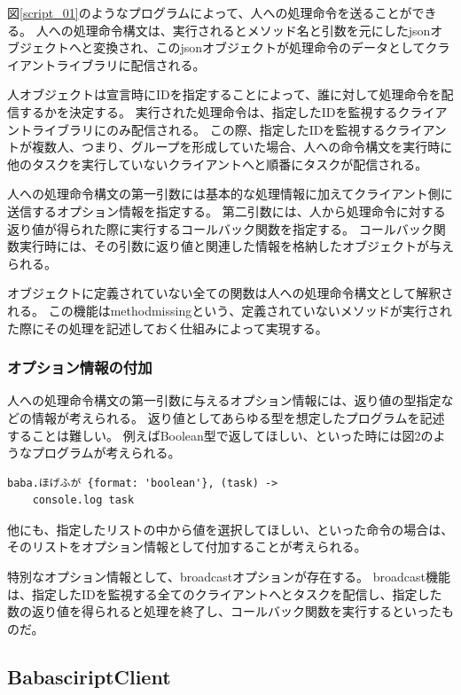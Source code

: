 図\ref{script_01}のようなプログラムによって、人への処理命令を送ることができる。
人への処理命令構文は、実行されるとメソッド名と引数を元にしたjsonオブジェクトへと変換され、このjsonオブジェクトが処理命令のデータとしてクライアントライブラリに配信される。

人オブジェクトは宣言時にIDを指定することによって、誰に対して処理命令を配信するかを決定する。
実行された処理命令は、指定したIDを監視するクライアントライブラリにのみ配信される。
この際、指定したIDを監視するクライアントが複数人、つまり、グループを形成していた場合、人への命令構文を実行時に他のタスクを実行していないクライアントへと順番にタスクが配信される。

人への処理命令構文の第一引数には基本的な処理情報に加えてクライアント側に送信するオプション情報を指定する。
第二引数には、人から処理命令に対する返り値が得られた際に実行するコールバック関数を指定する。
コールバック関数実行時には、その引数に返り値と関連した情報を格納したオブジェクトが与えられる。

オブジェクトに定義されていない全ての関数は人への処理命令構文として解釈される。
この機能はmethodmissingという、定義されていないメソッドが実行された際にその処理を記述しておく仕組みによって実現する。

\subsubsection{オプション情報の付加}\label{ux30aaux30d7ux30b7ux30e7ux30f3ux60c5ux5831ux306eux4ed8ux52a0}

人への処理命令構文の第一引数に与えるオプション情報には、返り値の型指定などの情報が考えられる。
返り値としてあらゆる型を想定したプログラムを記述することは難しい。
例えばBoolean型で返してほしい、といった時には図2のようなプログラムが考えられる。

\begin{verbatim}
baba.ほげふが {format: 'boolean'}, (task) ->
    console.log task
\end{verbatim}

他にも、指定したリストの中から値を選択してほしい、といった命令の場合は、そのリストをオプション情報として付加することが考えられる。

特別なオプション情報として、broadcastオプションが存在する。
broadcast機能は、指定したIDを監視する全てのクライアントへとタスクを配信し、指定した数の返り値を得られると処理を終了し、コールバック関数を実行するといったものだ。

\subsection{BabasciriptClient}\label{babasciriptclient}

